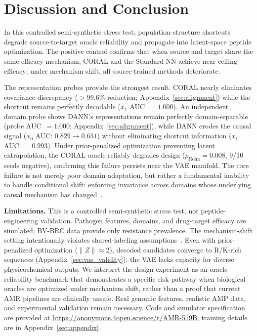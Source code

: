 \documentclass{article}
\begin{document}
\label{sec:discussion}
\section{Discussion and Conclusion}
In this controlled semi-synthetic stress test, population-structure shortcuts degrade source-to-target oracle reliability and propagate into latent-space peptide optimization. The positive control confirms that when source and target share the same efficacy mechanism, CORAL and the Standard NN achieve near-ceiling efficacy; under mechanism shift, all source-trained methods deteriorate.

The representation probes provide the strongest result. CORAL nearly eliminates covariance discrepancy ($>$99.6\% reduction; Appendix~\ref{sec:alignment}) while the shortcut remains perfectly decodable ($x_1$ AUC~$= 1.000$). An independent domain probe shows DANN's representations remain perfectly domain-separable (probe AUC~$= 1.000$; Appendix~\ref{sec:alignment}), while DANN erodes the causal signal ($x_0$ AUC: $0.829 \to 0.651$) without eliminating shortcut information ($x_1$ AUC~$= 0.993$). Under prior-penalized optimization preventing latent extrapolation, the CORAL oracle reliably degrades design ($p_{\text{Holm}} = 0.008$, 9/10 seeds negative), confirming this failure persists near the VAE manifold. The core failure is not merely poor domain adaptation, but rather a fundamental inability to handle conditional shift: enforcing invariance across domains whose underlying causal mechanism has changed~\cite{zhao2019learning}.

\textbf{Limitations.} This is a controlled semi-synthetic stress test, not peptide-engineering validation. Pathogen features, domains, and drug-target efficacy are simulated; BV-BRC data provide only resistance prevalence. The mechanism-shift setting intentionally violates shared-labeling assumptions~\cite{zhao2019learning}. Even with prior-penalized optimization ($\|Z\| \approx 2$), decoded candidates converge to R/K-rich sequences (Appendix~\ref{sec:vae_validity}); the VAE lacks capacity for diverse physicochemical outputs. We interpret the design experiment as an oracle-reliability benchmark that demonstrates a specific risk pathway when biological oracles are optimized under mechanism shift, rather than a proof that current AMR pipelines are clinically unsafe. Real genomic features, realistic AMP data, and experimental validation remain necessary. Code and simulator specification are provided at \url{https://anonymous.4open.science/r/AMR-519B}; training details are in Appendix~\ref{sec:appendix}.
\end{document}
